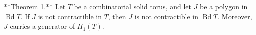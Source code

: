 **Theorem 1.** Let $T$ be a combinatorial solid torus, and let $J$ be a polygon in $\operatorname{Bd} T$. If $J$ is not contractible in $T$, then $J$ is not contractible in $\operatorname{Bd} T$. Moreover, $J$ carries a generator of $H_1(T)$.
